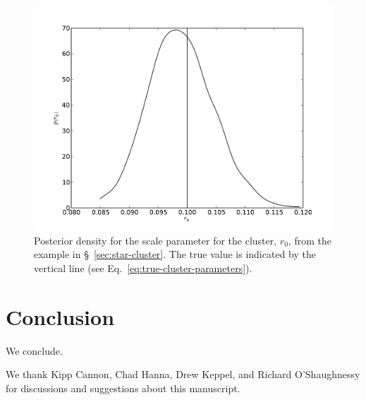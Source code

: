 \documentclass[aps,prd]{revtex4-1}
\begin{document}
\begin{figure}
  \includegraphics[width=\columnwidth]{scale}
  \caption{\label{fig:cluster-scale} Posterior density for the scale
    parameter for the cluster, $r_0$, from the example in
    \S~\ref{sec:star-cluster}.  The true value is indicated by the
    vertical line (see Eq.~\ref{eq:true-cluster-parameters}).}
\end{figure}

\section{Conclusion}
We conclude.  

\begin{acknowledgments}
  We thank Kipp Cannon, Chad Hanna, Drew Keppel, and Richard
  O'Shaughnessy for discussions and suggestions about this manuscript.
\end{acknowledgments}



\end{document}
